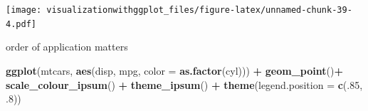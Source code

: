 \documentclass[]{krantz}
\makeatletter
\newenvironment{Shaded}{\begin{snugshade}}{\end{snugshade}}
\newcommand{\DataTypeTok}[1]{\textcolor[rgb]{0.13,0.29,0.53}{#1}}
\newcommand{\DecValTok}[1]{\textcolor[rgb]{0.00,0.00,0.81}{#1}}
\newcommand{\FloatTok}[1]{\textcolor[rgb]{0.00,0.00,0.81}{#1}}
\newcommand{\KeywordTok}[1]{\textcolor[rgb]{0.13,0.29,0.53}{\textbf{#1}}}
\newcommand{\NormalTok}[1]{#1}
\newcommand{\OperatorTok}[1]{\textcolor[rgb]{0.81,0.36,0.00}{\textbf{#1}}}
\newcommand{\StringTok}[1]{\textcolor[rgb]{0.31,0.60,0.02}{#1}}
\newenvironment{kframe}{%
\medskip{}
\setlength{\fboxsep}{.8em}
 \def\at@end@of@kframe{}%
 \ifinner\ifhmode%
  \def\at@end@of@kframe{\end{minipage}}%
  \begin{minipage}{\columnwidth}%
 \fi\fi%
 \def\FrameCommand##1{\hskip\@totalleftmargin \hskip-\fboxsep
 \colorbox{shadecolor}{##1}\hskip-\fboxsep
     \hskip-\linewidth \hskip-\@totalleftmargin \hskip\columnwidth}%
 \MakeFramed {\advance\hsize-\width
   \@totalleftmargin\z@ \linewidth\hsize
   \@setminipage}}%
 {\par\unskip\endMakeFramed%
 \at@end@of@kframe}
\renewenvironment{Shaded}{\begin{kframe}}{\end{kframe}}
\makeatother
\begin{document}
\texttt{[image: visualizationwithggplot\_files/figure-latex/unnamed-chunk-39-4.pdf]}

order of application matters

\begin{Shaded}
\begin{Highlighting}[]
\KeywordTok{ggplot}\NormalTok{(mtcars, }\KeywordTok{aes}\NormalTok{(disp, mpg, }\DataTypeTok{color =} \KeywordTok{as.factor}\NormalTok{(cyl))) }\OperatorTok{+}\StringTok{ }\KeywordTok{geom_point}\NormalTok{()}\OperatorTok{+}\StringTok{  }\KeywordTok{scale_colour_ipsum}\NormalTok{() }\OperatorTok{+}\StringTok{ }
\KeywordTok{theme_ipsum}\NormalTok{() }\OperatorTok{+}
\KeywordTok{theme}\NormalTok{(}\DataTypeTok{legend.position =} \KeywordTok{c}\NormalTok{(.}\DecValTok{85}\NormalTok{, }\FloatTok{.8}\NormalTok{))}
\end{Highlighting}
\end{Shaded}
\end{document}
